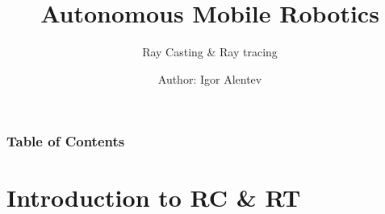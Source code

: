 \documentclass[
    11pt, %
    aspectratio=169, %
]{beamer}
\title[]{Autonomous Mobile Robotics}
\subtitle[]{Ray Casting \& Ray tracing}
\author[]{Author: Igor Alentev}
\institute[]{Innopolis University \\ \smallskip \textit{i.alentev@innopolis.university}}
\date[IU S23]
\begin{document}
\section{}
\begin{frame}
	\titlepage %
 
\end{frame}


\begin{frame}
	\frametitle{Table of Contents} %
	
	\tableofcontents %
\end{frame}


\section{Introduction to RC \& RT}
\end{document}
